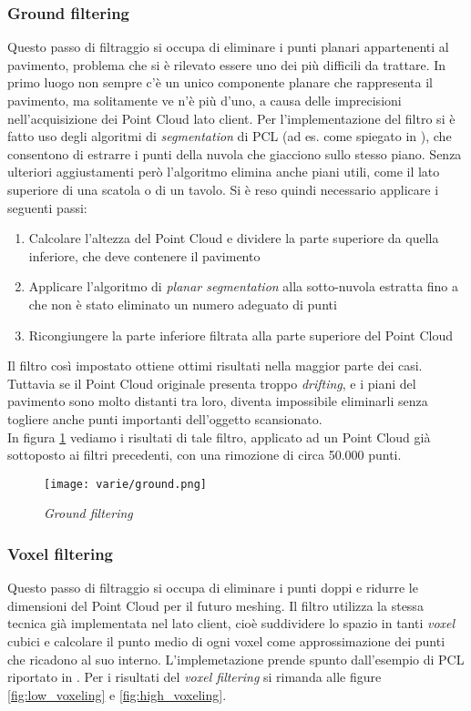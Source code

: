\subsubsection{Ground filtering}
Questo passo di filtraggio si occupa di eliminare i punti planari appartenenti al pavimento, problema che si è rilevato essere uno dei più difficili da trattare. 
In primo luogo non sempre c'è un unico componente planare che rappresenta il pavimento, ma solitamente ve n'è più d'uno, a causa delle imprecisioni nell'acquisizione dei Point Cloud lato client. Per l'implementazione del filtro si è fatto uso degli algoritmi di \emph{segmentation} di PCL (ad es. come spiegato in \cite{site:segmentation}), che consentono di estrarre i punti della nuvola che giacciono sullo stesso piano. Senza ulteriori aggiustamenti però l'algoritmo elimina anche piani utili, come il lato superiore di una scatola o di un tavolo.
Si è reso quindi necessario applicare i seguenti passi:
\begin{enumerate}
\item Calcolare l'altezza del Point Cloud e dividere la parte superiore da quella inferiore, che deve contenere il pavimento
\item Applicare l'algoritmo di \emph{planar segmentation} alla sotto-nuvola estratta fino a che non è stato eliminato un numero adeguato di punti
\item Ricongiungere la parte inferiore filtrata alla parte superiore del Point Cloud
\end{enumerate}
Il filtro così impostato ottiene ottimi risultati nella maggior parte dei casi. Tuttavia se il Point Cloud originale presenta troppo  \emph{drifting}, e i piani del pavimento sono molto distanti tra loro, diventa impossibile eliminarli senza togliere anche punti importanti dell'oggetto scansionato.\\
In figura \ref{fig:ground} vediamo i risultati di tale filtro, applicato ad un Point Cloud già sottoposto ai filtri precedenti, con una rimozione di circa 50.000 punti.
\begin{figure}[!h] 
    \centering 
    \texttt{[image: varie/ground.png]} 
    \caption{\emph{Ground filtering}}
    \label{fig:ground}
\end{figure}

\subsubsection{Voxel filtering}
Questo passo di filtraggio si occupa di eliminare i punti doppi e ridurre le dimensioni del Point Cloud per il futuro meshing. Il filtro utilizza la stessa tecnica già implementata nel lato client, cioè suddividere lo spazio in tanti \emph{voxel} cubici e  calcolare il punto medio di ogni voxel come approssimazione dei punti che ricadono al suo interno. L'implemetazione prende spunto dall'esempio di PCL riportato in \cite{site:voxel}.
Per i risultati del \emph{voxel filtering} si rimanda alle figure \ref{fig:low_voxeling} e \ref{fig:high_voxeling}.
